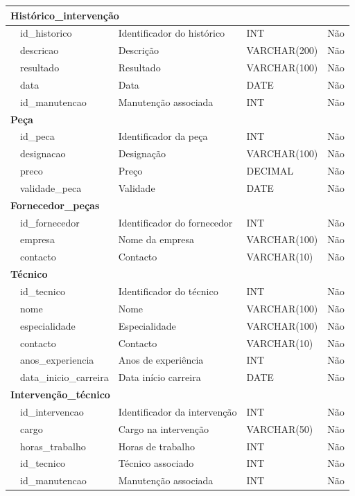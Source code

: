 {\begin{longtable}{p{2.5cm} p{3cm} p{5cm} p{2cm} c}
\midrule
\multicolumn{5}{l}{\textbf{Histórico_intervenção}} \\
\midrule
 & id_historico & Identificador do histórico & INT & Não \\
 & descricao & Descrição & VARCHAR(200) & Não \\
 & resultado & Resultado & VARCHAR(100) & Não \\
 & data & Data & DATE & Não \\
 & id_manutencao & Manutenção associada & INT & Não \\

\midrule
\multicolumn{5}{l}{\textbf{Peça}} \\
\midrule
 & id_peca & Identificador da peça & INT & Não \\
 & designacao & Designação & VARCHAR(100) & Não \\
 & preco & Preço & DECIMAL & Não \\
 & validade_peca & Validade & DATE & Não \\

\midrule
\multicolumn{5}{l}{\textbf{Fornecedor_peças}} \\
\midrule
 & id_fornecedor & Identificador do fornecedor & INT & Não \\
 & empresa & Nome da empresa & VARCHAR(100) & Não \\
 & contacto & Contacto & VARCHAR(10) & Não \\

\midrule
\multicolumn{5}{l}{\textbf{Técnico}} \\
\midrule
 & id_tecnico & Identificador do técnico & INT & Não \\
 & nome & Nome & VARCHAR(100) & Não \\
 & especialidade & Especialidade & VARCHAR(100) & Não \\
 & contacto & Contacto & VARCHAR(10) & Não \\
 & anos_experiencia & Anos de experiência & INT & Não \\
 & data_inicio_carreira & Data início carreira & DATE & Não \\

\midrule
\multicolumn{5}{l}{\textbf{Intervenção_técnico}} \\
\midrule
 & id_intervencao & Identificador da intervenção & INT & Não \\
 & cargo & Cargo na intervenção & VARCHAR(50) & Não \\
 & horas_trabalho & Horas de trabalho & INT & Não \\
 & id_tecnico & Técnico associado & INT & Não \\
 & id_manutencao & Manutenção associada & INT & Não \\


\end{longtable}}
